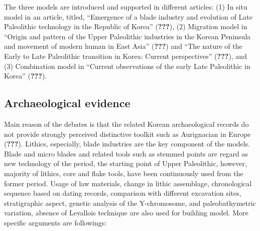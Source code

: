 \documentclass[american,man]{apa6}
\begin{document}
The three models are introduced and supported in different articles: (1)
In situ model in an article, titled, \enquote{Emergence of a blade
industry and evolution of Late Paleolithic technology in the Republic of
Korea} ({\textbf{???}}), (2) Migration model in \enquote{Origin and
pattern of the Upper Paleolithic industries in the Korean Peninsula and
movement of modern human in East Asia} ({\textbf{???}}) and \enquote{The
nature of the Early to Late Paleolithic transition in Korea: Current
perspectives} ({\textbf{???}}), and (3) Combination model in
\enquote{Current observations of the early Late Paleolithic in Korea}
({\textbf{???}}).

\subsection{Archaeological evidence}\label{archaeological-evidence}

Main reason of the debates is that the related Korean archaeological
records do not provide strongly perceived distinctive toolkit such as
Aurignacian in Europe ({\textbf{???}}). Lithics, especially, blade
industries are the key component of the models. Blade and micro blades
and related tools such as stemmed points are regard as new technology of
the period, the starting point of Upper Paleolithic, however, majority
of lithics, core and flake tools, have been continuously used from the
former period. Usage of law materials, change in lithic assemblage,
chronological sequence based on dating records, comparison with
different excavation sites, stratigraphic aspect, genetic analysis of
the Y-chromosome, and paleobathymetric variation, absence of Levallois
technique are also used for building model. More specific arguments are
followings:
\end{document}
